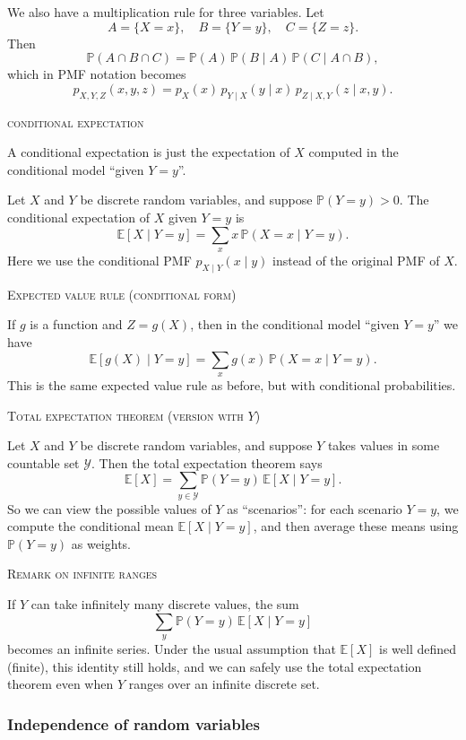 We also have a multiplication rule for three variables.  
Let
\[
A = \{X=x\}, \quad B = \{Y=y\}, \quad C = \{Z=z\}.
\]
Then
\[
\mathbb{P}(A \cap B \cap C)
= \mathbb{P}(A)\,\mathbb{P}(B\mid A)\,\mathbb{P}(C\mid A \cap B),
\]
which in PMF notation becomes
\[
p_{X,Y,Z}(x,y,z)
= p_X(x)\,p_{Y\mid X}(y\mid x)\,p_{Z\mid X,Y}(z\mid x,y).
\]

\bigskip\textsc{conditional expectation}

A conditional expectation is just the expectation of \(X\) computed in the conditional model “given \(Y=y\)”.


Let \(X\) and \(Y\) be discrete random variables, and suppose \(\mathbb{P}(Y = y) > 0\).  
The conditional expectation of \(X\) given \(Y=y\) is
\[
\mathbb{E}[X \mid Y = y]
= \sum_{x} x \,\mathbb{P}(X = x \mid Y = y).
\]
Here we use the conditional PMF \(p_{X\mid Y}(x\mid y)\) instead of the original PMF of \(X\).

\bigskip\textsc{Expected value rule (conditional form)}

If \(g\) is a function and \(Z = g(X)\), then in the conditional model “given \(Y=y\)” we have
\[
\mathbb{E}[g(X) \mid Y = y]
= \sum_{x} g(x)\,\mathbb{P}(X = x \mid Y = y).
\]
This is the same expected value rule as before, but with conditional probabilities.

\bigskip\textsc{Total expectation theorem (version with \(Y\))}

Let \(X\) and \(Y\) be discrete random variables, and suppose \(Y\) takes values in some countable set \(\mathcal{Y}\).  
Then the total expectation theorem says
\[
\mathbb{E}[X]
= \sum_{y \in \mathcal{Y}} \mathbb{P}(Y = y)\,\mathbb{E}[X \mid Y = y].
\]
So we can view the possible values of \(Y\) as “scenarios”:  
for each scenario \(Y=y\), we compute the conditional mean \(\mathbb{E}[X \mid Y=y]\), and then average these means using \(\mathbb{P}(Y=y)\) as weights.

\bigskip\textsc{Remark on infinite ranges}

If \(Y\) can take infinitely many discrete values, the sum
\[
\sum_{y} \mathbb{P}(Y = y)\,\mathbb{E}[X \mid Y = y]
\]
becomes an infinite series.  
Under the usual assumption that \(\mathbb{E}[X]\) is well defined (finite), this identity still holds, and we can safely use the total expectation theorem even when \(Y\) ranges over an infinite discrete set.


\subsubsection{Independence of random variables}

